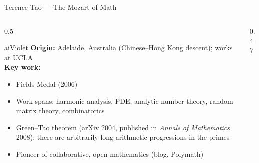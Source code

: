 \begin{frame}[shrink=13]{Terence Tao --- The Mozart of Math}

  \begin{columns}[T]
    \begin{column}{0.5\textwidth}
      \begin{personbox}{aiViolet}
        \textbf{Origin:} Adelaide, Australia (Chinese--Hong Kong descent);
        works at UCLA\\[3pt]
        \textbf{Key work:}
        \begin{itemize}\setlength\itemsep{2pt}
          \item Fields Medal (2006)
          \item Work spans: harmonic analysis, PDE, analytic number theory,
                random matrix theory, combinatorics
          \item \alert{Green--Tao theorem} (arXiv 2004, published in
                \textit{Annals of Mathematics} 2008): there are arbitrarily
                long arithmetic progressions in the primes
          \item Pioneer of collaborative, open mathematics (blog, Polymath)
        \end{itemize}
      \end{personbox}
    \end{column}

    \begin{column}{0.47\textwidth}
    \end{column}
  \end{columns}

\end{frame}

